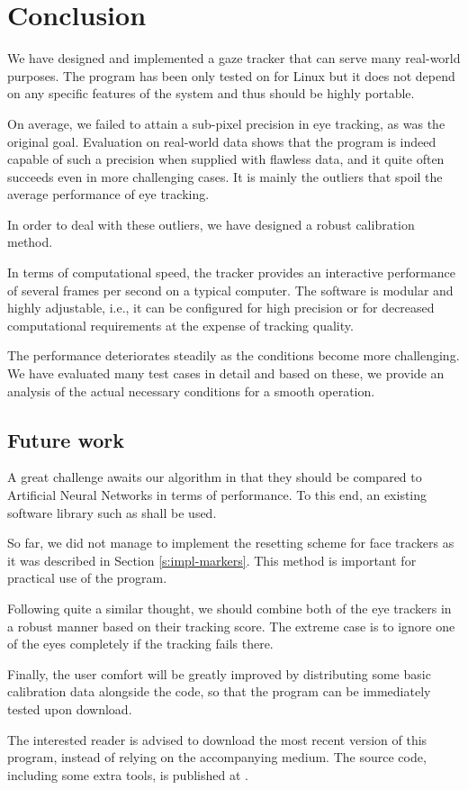 \chapter*{Conclusion}

We have designed and implemented a gaze tracker that can serve many real-world purposes.
The program has been only tested on for Linux but it does not depend on any specific features of the system and thus should be highly portable.

On average, we failed to attain a sub-pixel precision in eye tracking, as was the original goal.
Evaluation on real-world data shows that  the program is indeed capable of such a precision when supplied with flawless data, and it quite often succeeds even in more challenging cases.
It is mainly the outliers that spoil the average performance of eye tracking.

In order to deal with these outliers, we have designed a robust calibration method.

In terms of computational speed, the tracker provides an interactive performance of several frames per second on a typical computer.
The software is modular and highly adjustable, i.e., it can be configured for high precision or for decreased computational requirements at the expense of tracking quality.

The performance deteriorates steadily as the conditions become more challenging.
We have evaluated many test cases in detail and based on these, we provide an analysis of the actual necessary conditions for a smooth operation.

\section*{Future work}

A great challenge awaits our algorithm in that they should be compared to Artificial Neural Networks in terms of performance.
To this end, an existing software library such as \cite{deepgaze} shall be used.

So far, we did not manage to implement the resetting scheme for face trackers as it was described in Section \ref{s:impl-markers}.
This method is important for practical use of the program.

Following quite a similar thought, we should combine both of the eye trackers in a robust manner based on their tracking score.
The extreme case is to ignore one of the eyes completely if the tracking fails there.

Finally, the user comfort will be greatly improved by distributing some basic calibration data alongside the code, so that the program can be immediately tested upon download.

The interested reader is advised to download the most recent version of this program, instead of relying on the accompanying medium.
The source code, including some extra tools, is published at .
